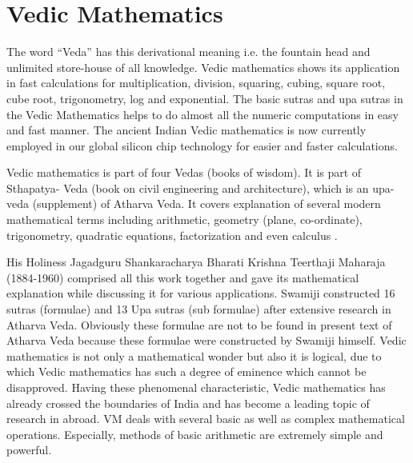 \chapter{Vedic Mathematics}
%
The word “Veda” has this derivational meaning i.e. the fountain head and unlimited store-house of all knowledge. Vedic mathematics shows its application in fast calculations for multiplication, division, squaring, cubing, square root, cube root, trigonometry, log and exponential. The basic sutras and upa sutras in the Vedic Mathematics helps to do almost all the numeric computations in easy and fast manner. The ancient Indian Vedic mathematics is now currently employed in our global silicon chip technology for easier and faster calculations.

Vedic mathematics is part of four Vedas (books of wisdom). It is part of Sthapatya- Veda (book on civil engineering and architecture), which is an upa-veda (supplement) of Atharva Veda. It covers explanation of several modern mathematical terms including arithmetic, geometry (plane, co-ordinate), trigonometry, quadratic equations, factorization and even calculus \cite{r1}.

His Holiness Jagadguru Shankaracharya Bharati Krishna Teerthaji Maharaja (1884-1960) comprised all this work together and gave its mathematical explanation while discussing it for various applications. Swamiji constructed 16 sutras (formulae) and 13 Upa sutras (sub formulae) after extensive research in Atharva Veda. Obviously these formulae are not to be found in present text of Atharva Veda because these formulae were constructed by Swamiji himself. Vedic mathematics is not only a mathematical wonder but also it is logical, due to which Vedic mathematics has such a degree of eminence which cannot be disapproved. Having these phenomenal characteristic, Vedic mathematics has already crossed the boundaries of India and has become a leading topic of research in abroad. VM deals with several basic as well as complex mathematical operations. Especially, methods of basic arithmetic are extremely simple and powerful.

